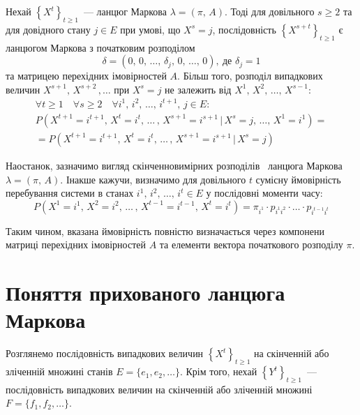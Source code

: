 \begin{theorem}
    Нехай $\left\{ X^t \right\}_{t\geqslant 1}$~--- ланцюг Маркова $\lambda=(\pi,\,A)$. Тоді для довільного $s \geqslant 2$ та для довідного стану $j \in E$ при умові, що $X^s=j$, послідовність $\left\{ X^{s+t} \right\}_{t\geqslant 1}$ є ланцюгом Маркова з початковим розподілом
    \begin{equation*}
        \delta = (0,\,0,\,\ldots,\,\delta_j,\,0,\,\ldots,\,0),\ \text{де } \delta_j = 1
    \end{equation*}
    та матрицею перехідних імовірностей $A$. Більш того, розподіл випадкових величин $X^{s+1},\,X^{s+2}\,,\ldots$ при $X^s=j$ не залежить від $X^{1},\,X^{2},\,\ldots,\,X^{s-1}:$
    \begin{multline*}
        \forall t\geqslant 1 \quad \forall s\geqslant 2 \quad \forall i^1,\,i^2,\,\ldots,\,i^{t+1},\,j \in E: \\
	    P\left( X^{t+1}=i^{t+1},\,X^t=i^t,\,\ldots\,,\, X^{s+1}=i^{s+1} \,|\, X^{s}=j,\,\ldots,\,X^1=i^1 \right) = \\
        = P\left( X^{t+1}=i^{t+1},\,X^t=i^t,\,\ldots\,,\, X^{s+1}=i^{s+1} \,|\, X^{s}=j \right)
    \end{multline*}
\end{theorem}

Наостанок, зазначимо вигляд скінченновимірних розподілів~\cite{Norris1997} ланцюга Маркова $\lambda=(\pi,\,A)$. Інакше кажучи, визначимо для довільного $t$ сумісну ймовірність перебування системи в станах $i^1,\,i^2,\,\ldots,\,i^{t} \in E$ у послідовні моменти часу:
\begin{equation*}
    P\left( X^{1}=i^{1},\,X^{2}=i^{2},\,\ldots\,,\, X^{t-1}=i^{t-1},\, X^{t}=i^{t} \right) = \pi_{i^1} \cdot p_{i^1i^2} \cdot \ldots \cdot p_{i^{t-1}i^{t}}
\end{equation*}

Таким чином, вказана ймовірність повністю визначається через компонени матриці перехідних імовірностей $A$ та елементи вектора початкового розподілу $\pi$.

\section{Поняття прихованого ланцюга Маркова}

Розглянемо послідовність випадкових величин $\left\{ X^t \right\}_{t\geqslant 1}$ на скінченній або зліченній множині станів $E=\{e_1,e_2,\ldots\}$. Крім того, нехай $\left\{ Y^t \right\}_{t\geqslant 1}$~--- послідовність випадкових величин на скінченній або зліченній множині $F=\{f_1,f_2,\ldots\}$. 

